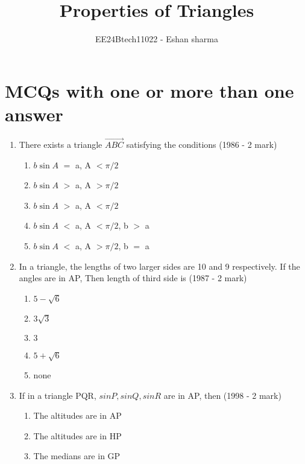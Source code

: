 \documentclass[journal,12pt,twocolumn]{IEEEtran}
\theoremstyle{remark}
\begin{document}

\vspace{3cm}

\title{Properties of Triangles}
\author{EE24Btech11022 - Eshan sharma}
\maketitle
\newpage
\bigskip

\renewcommand{\thefigure}{\theenumi}
\renewcommand{\thetable}{\theenumi}


\section{MCQs with one or more than one answer}
\begin{enumerate}
	\item There exists a triangle $\vec{ABC}$ satisfying the conditions
    \hfill{(1986 - 2 mark)}
    \begin{enumerate}
    \item $b\sin{A}$ $=$ a, A $<\pi/2$
    \item $b\sin{A}$ $>$ a, A $>\pi/2$
    \item $b\sin{A}$ $>$ a, A $<\pi/2$
    \item $b\sin{A}$ $<$ a, A $<\pi/2$, b $>$ a
    \item $b\sin{A}$ $<$ a, A $>\pi/2$, b $=$ a
    \end{enumerate}
    \item In a triangle, the lengths of two larger sides are 10 and 9 respectively. If the angles are in AP, Then length of third side is
    \hfill{(1987 - 2 mark)}
    \begin{multicols}{2}
    \begin{enumerate}
    \item $5-\sqrt{6}$ 
    \item $3\sqrt{3}$
    \item $3$
    \item $5+\sqrt{6}$ 
    \item none
    \end{enumerate}
    \end{multicols}
    \item If in a triangle PQR, $sinP, sinQ, sinR$ are in AP, then
    \hfill{(1998 - 2 mark)}
    \begin{enumerate}
    \item The altitudes are in AP
    \item The altitudes are in HP
    \item The medians are in GP

\end{enumerate}
\end{enumerate}
\end{document}
